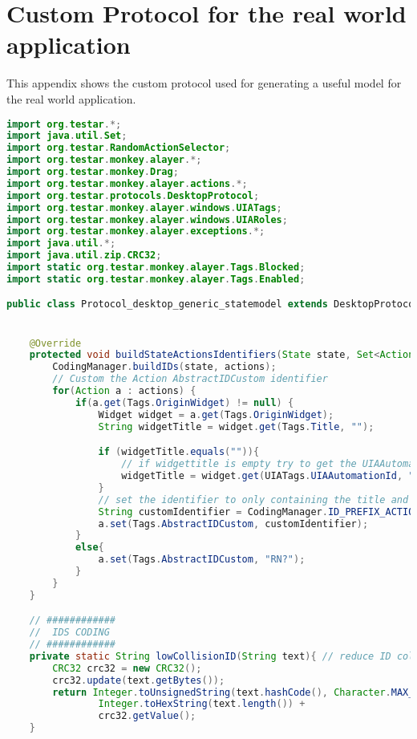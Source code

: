 \chapter{Custom Protocol for the real world application} \label{appendix:real-world-experiment}

This appendix shows the custom protocol used for generating a useful model for the real world application.

\begin{lstlisting}[language=java, basicstyle=\tiny, caption=Protocol for the real world application, label=code:real-world-app-protocol]
import org.testar.*;
import java.util.Set;
import org.testar.RandomActionSelector;
import org.testar.monkey.alayer.*;
import org.testar.monkey.Drag;
import org.testar.monkey.alayer.actions.*;
import org.testar.protocols.DesktopProtocol;
import org.testar.monkey.alayer.windows.UIATags;
import org.testar.monkey.alayer.windows.UIARoles;
import org.testar.monkey.alayer.exceptions.*;
import java.util.*;
import java.util.zip.CRC32;
import static org.testar.monkey.alayer.Tags.Blocked;
import static org.testar.monkey.alayer.Tags.Enabled;

public class Protocol_desktop_generic_statemodel extends DesktopProtocol {


    @Override
    protected void buildStateActionsIdentifiers(State state, Set<Action> actions) {
        CodingManager.buildIDs(state, actions);
        // Custom the Action AbstractIDCustom identifier
        for(Action a : actions) {
            if(a.get(Tags.OriginWidget) != null) {
                Widget widget = a.get(Tags.OriginWidget);
                String widgetTitle = widget.get(Tags.Title, "");

                if (widgetTitle.equals("")){
                    // if widgettitle is empty try to get the UIAAutomationId as title. 
                    widgetTitle = widget.get(UIATags.UIAAutomationId, "unkown");
                }
                // set the identifier to only containing the title and not to include the parent
                String customIdentifier = CodingManager.ID_PREFIX_ACTION + CodingManager.ID_PREFIX_ABSTRACT_CUSTOM + lowCollisionID(widgetTitle);
                a.set(Tags.AbstractIDCustom, customIdentifier);
            }
            else{
                a.set(Tags.AbstractIDCustom, "RN?");
            }
        }
    }

    // ############
    //  IDS CODING
    // ############
    private static String lowCollisionID(String text){ // reduce ID collision probability
        CRC32 crc32 = new CRC32();
        crc32.update(text.getBytes());
        return Integer.toUnsignedString(text.hashCode(), Character.MAX_RADIX) +
                Integer.toHexString(text.length()) +
                crc32.getValue();
    }


\end{lstlisting}
